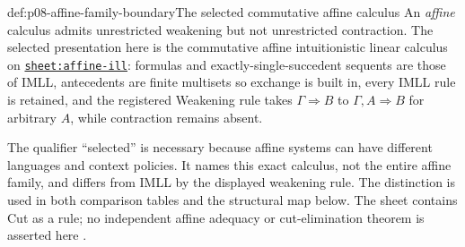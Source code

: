 \begin{hbdefinition}{def:p08-affine-family-boundary}{The selected commutative affine calculus}
An \emph{affine} calculus admits unrestricted weakening but not unrestricted
contraction.  The selected presentation here is the commutative affine
intuitionistic linear calculus on
\hyperref[sheet:affine-ill]{\texttt{sheet:affine-ill}}: formulas and
exactly-single-succedent sequents are those of IMLL, antecedents are finite
multisets so exchange is built in, every IMLL rule is retained, and the
registered Weakening rule takes \(\Gamma\Rightarrow B\) to
\(\Gamma,A\Rightarrow B\) for arbitrary \(A\), while contraction remains
absent.

The qualifier ``selected'' is necessary because affine systems can have
different languages and context policies.  It names this exact calculus, not
the entire affine family, and differs from IMLL by the displayed weakening
rule.  The distinction is used in both comparison tables and the structural
map below.  The sheet contains Cut as a rule; no independent affine adequacy or
cut-elimination theorem is asserted here \cite{Lincoln1995}.
\end{hbdefinition}

